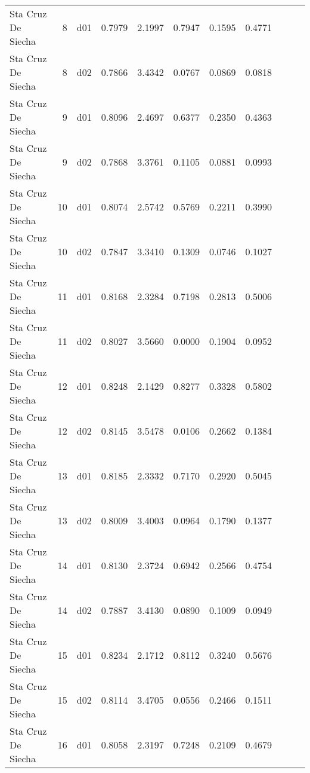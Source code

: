 \begin{landscape}
\begin{longtable}{p{2cm}rrrrrrrrrr}
      Sta Cruz De Siecha  &          8 &     d01 &   0.7979 &  2.1997 &        0.7947 &           0.1595 &  0.4771 \\
      Sta Cruz De Siecha  &          8 &     d02 &   0.7866 &  3.4342 &        0.0767 &           0.0869 &  0.0818 \\
      Sta Cruz De Siecha  &          9 &     d01 &   0.8096 &  2.4697 &        0.6377 &           0.2350 &  0.4363 \\
      Sta Cruz De Siecha  &          9 &     d02 &   0.7868 &  3.3761 &        0.1105 &           0.0881 &  0.0993 \\
      Sta Cruz De Siecha  &         10 &     d01 &   0.8074 &  2.5742 &        0.5769 &           0.2211 &  0.3990 \\
      Sta Cruz De Siecha  &         10 &     d02 &   0.7847 &  3.3410 &        0.1309 &           0.0746 &  0.1027 \\
      Sta Cruz De Siecha  &         11 &     d01 &   0.8168 &  2.3284 &        0.7198 &           0.2813 &  0.5006 \\
      Sta Cruz De Siecha  &         11 &     d02 &   0.8027 &  3.5660 &        0.0000 &           0.1904 &  0.0952 \\
      Sta Cruz De Siecha  &         12 &     d01 &   0.8248 &  2.1429 &        0.8277 &           0.3328 &  0.5802 \\
      Sta Cruz De Siecha  &         12 &     d02 &   0.8145 &  3.5478 &        0.0106 &           0.2662 &  0.1384 \\
      Sta Cruz De Siecha  &         13 &     d01 &   0.8185 &  2.3332 &        0.7170 &           0.2920 &  0.5045 \\
      Sta Cruz De Siecha  &         13 &     d02 &   0.8009 &  3.4003 &        0.0964 &           0.1790 &  0.1377 \\
      Sta Cruz De Siecha  &         14 &     d01 &   0.8130 &  2.3724 &        0.6942 &           0.2566 &  0.4754 \\
      Sta Cruz De Siecha  &         14 &     d02 &   0.7887 &  3.4130 &        0.0890 &           0.1009 &  0.0949 \\
      Sta Cruz De Siecha  &         15 &     d01 &   0.8234 &  2.1712 &        0.8112 &           0.3240 &  0.5676 \\
      Sta Cruz De Siecha  &         15 &     d02 &   0.8114 &  3.4705 &        0.0556 &           0.2466 &  0.1511 \\
      Sta Cruz De Siecha  &         16 &     d01 &   0.8058 &  2.3197 &        0.7248 &           0.2109 &  0.4679 \\

\end{longtable}
\end{landscape}
